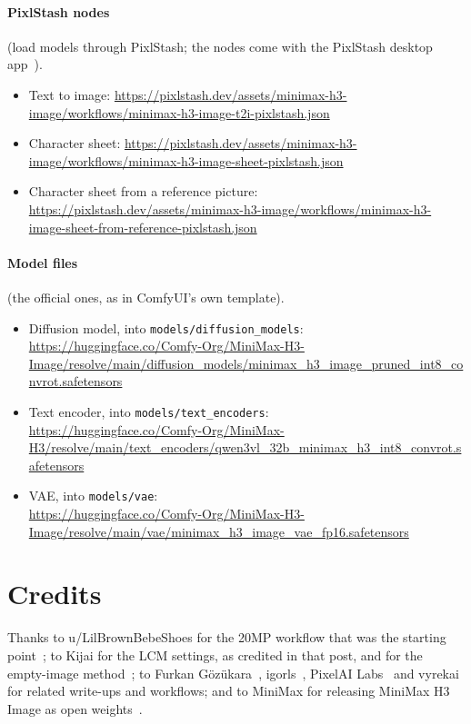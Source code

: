\documentclass[11pt,a4paper]{article}
\begin{document}
\paragraph{PixlStash nodes} (load models through PixlStash; the nodes come with the PixlStash desktop app~\cite{comfyui-pixlstash}).
\begin{itemize}
\item Text to image: \url{https://pixlstash.dev/assets/minimax-h3-image/workflows/minimax-h3-image-t2i-pixlstash.json}
\item Character sheet: \url{https://pixlstash.dev/assets/minimax-h3-image/workflows/minimax-h3-image-sheet-pixlstash.json}
\item Character sheet from a reference picture:\\
\url{https://pixlstash.dev/assets/minimax-h3-image/workflows/minimax-h3-image-sheet-from-reference-pixlstash.json}
\end{itemize}

\paragraph{Model files} (the official ones, as in ComfyUI's own template).
\begin{itemize}
\item Diffusion model, into \texttt{models/diffusion\_models}:\\
\url{https://huggingface.co/Comfy-Org/MiniMax-H3-Image/resolve/main/diffusion_models/minimax_h3_image_pruned_int8_convrot.safetensors}
\item Text encoder, into \texttt{models/text\_encoders}:\\
\url{https://huggingface.co/Comfy-Org/MiniMax-H3/resolve/main/text_encoders/qwen3vl_32b_minimax_h3_int8_convrot.safetensors}
\item VAE, into \texttt{models/vae}:\\
\url{https://huggingface.co/Comfy-Org/MiniMax-H3-Image/resolve/main/vae/minimax_h3_image_vae_fp16.safetensors}
\end{itemize}

\section*{Credits}

Thanks to u/LilBrownBebeShoes for the 20MP workflow that was the starting point~\cite{reddit}; to Kijai for the LCM settings, as credited in that post, and for the empty-image method~\cite{kjnodes}; to Furkan G\"oz\"ukara~\cite{furkan}, igorls~\cite{igorls}, PixelAI Labs~\cite{pixelai} and vyrekai~\cite{vyrekai} for related write-ups and workflows; and to MiniMax for releasing MiniMax H3 Image as open weights~\cite{minimax}.
\end{document}
